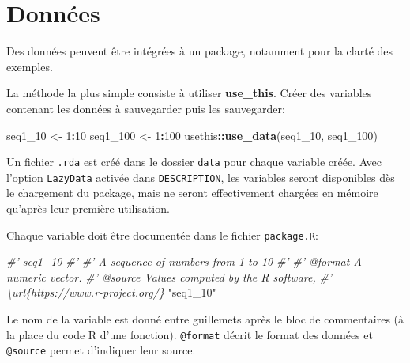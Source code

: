 \documentclass[
  12pt,
  french,
  a4paper,
  extrafontsizes,onecolumn,openright
  ]{memoir}
\newenvironment{Shaded}{\begin{snugshade}}{\end{snugshade}}
\newcommand{\CommentTok}[1]{\textcolor[rgb]{0.56,0.35,0.01}{\textit{#1}}}
\newcommand{\DecValTok}[1]{\textcolor[rgb]{0.00,0.00,0.81}{#1}}
\newcommand{\KeywordTok}[1]{\textcolor[rgb]{0.13,0.29,0.53}{\textbf{#1}}}
\newcommand{\NormalTok}[1]{#1}
\newcommand{\OperatorTok}[1]{\textcolor[rgb]{0.81,0.36,0.00}{\textbf{#1}}}
\newcommand{\StringTok}[1]{\textcolor[rgb]{0.31,0.60,0.02}{#1}}
\begin{document}
\normalsize

\hypertarget{donnuxe9es}{%
\section{Données}\label{donnuxe9es}}

Des données peuvent être intégrées à un package, notamment pour la clarté des exemples.

La méthode la plus simple consiste à utiliser \textbf{use\_this}.
Créer des variables contenant les données à sauvegarder puis les sauvegarder:

\scriptsize

\begin{Shaded}
\begin{Highlighting}[]
\NormalTok{seq1_}\DecValTok{10}\NormalTok{ <-}\StringTok{ }\DecValTok{1}\OperatorTok{:}\DecValTok{10}
\NormalTok{seq1_}\DecValTok{100}\NormalTok{ <-}\StringTok{ }\DecValTok{1}\OperatorTok{:}\DecValTok{100}
\NormalTok{usethis}\OperatorTok{::}\KeywordTok{use_data}\NormalTok{(seq1_}\DecValTok{10}\NormalTok{, seq1_}\DecValTok{100}\NormalTok{)}
\end{Highlighting}
\end{Shaded}

\normalsize

Un fichier \texttt{.rda} est créé dans le dossier \texttt{data} pour chaque variable créée.
Avec l'option \texttt{LazyData} activée dans \texttt{DESCRIPTION}, les variables seront disponibles dès le chargement du package, mais ne seront effectivement chargées en mémoire qu'après leur première utilisation.

Chaque variable doit être documentée dans le fichier \texttt{package.R}:

\scriptsize

\begin{Shaded}
\begin{Highlighting}[]
\CommentTok{#' seq1_10}
\CommentTok{#'}
\CommentTok{#' A sequence of numbers from 1 to 10}
\CommentTok{#'}
\CommentTok{#' @format A numeric vector.}
\CommentTok{#' @source Values computed by the R software, }
\CommentTok{#'   \textbackslash{}url\{https://www.r-project.org/\}}
\StringTok{"seq1_10"}
\end{Highlighting}
\end{Shaded}

\normalsize

Le nom de la variable est donné entre guillemets après le bloc de commentaires (à la place du code R d'une fonction).
\texttt{@format} décrit le format des données et \texttt{@source} permet d'indiquer leur source.
\end{document}
